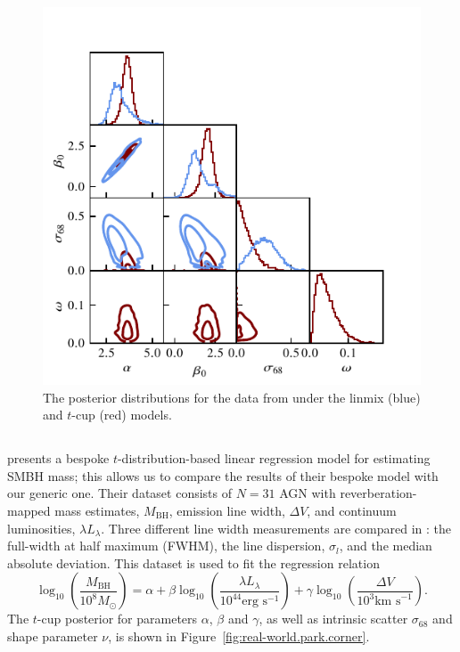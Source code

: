 \documentclass[fleqn,usenatbib]{rasti}
\begin{document}
\begin{figure}
    \includegraphics[width=\columnwidth]{graphics/real/corner_kelly.pdf}
    \caption{The posterior distributions for the data from \citet{Kelly:2007}
    under the linmix (blue) and $t$-cup (red) models.}
    \label{fig:real-world.kelly.corner}
\end{figure}

\subsection[Park et al. (2017)]{\citet{Park:2017}}

\citet{Park:2017} presents a bespoke $t$-distribution-based linear regression
model for estimating SMBH mass; this allows us to compare the results of their
bespoke model with our generic one. Their dataset consists of $N = 31$ AGN with
reverberation-mapped mass estimates, $M_{\text{BH}}$,  emission line
width, $\Delta V$, and continuum luminosities, $\lambda L_{\lambda}$. Three
different  line width measurements are compared in \citet{Park:2017}:
the full-width at half maximum (FWHM), the line dispersion, $\sigma_l$, and the
median absolute deviation. This dataset is used to fit the regression relation
\begin{equation}
    \log_{10}\!\left( \frac{M_{\text{BH}}}{10^8 M_\odot} \right)\! =
        \alpha +
        \beta \log_{10}\! \left( \frac{\lambda L_{\lambda}}{10^{44} \text{erg s}^{-1}} \right) +
        \gamma \log_{10}\!\left( \frac{\Delta V}{10^3 \text{km s}^{-1}} \right).
        \label{eqn:real-world.park}
\end{equation}
The $t$-cup posterior for parameters $\alpha$, $\beta$ and $\gamma$, as well as
intrinsic scatter $\sigma_{68}$ and shape parameter $\nu$, is shown in
Figure~\ref{fig:real-world.park.corner}.
\end{document}
